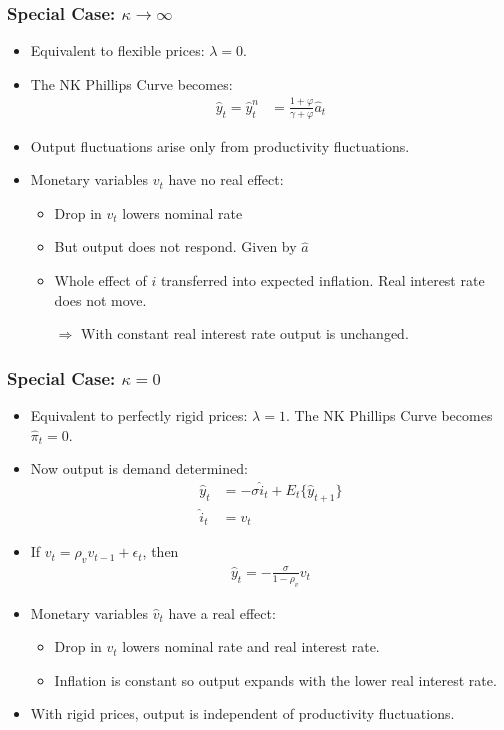 \documentclass[11pt,aspectratio=169,xcolor={dvipsnames},hyperref={pdftex,pdfpagemode=UseNone,hidelinks,pdfdisplaydoctitle=true},usepdftitle=false]{beamer}
\begin{document}
\begin{frame}
\frametitle{Special Case: $\kappa\rightarrow\infty$}
\begin{itemize}
	\item Equivalent to flexible prices: $\lambda=0$.
	\item The NK Phillips Curve becomes:
	\begin{align*}
		\hat{y}_t = \hat{y}_t^{n}&=\frac{1+\varphi}{\gamma+\varphi}\hat{a}_t 
	\end{align*}
	\item Output fluctuations arise only from productivity fluctuations.
	\item Monetary variables $v_t$ have no real effect:
	\begin{itemize}
		\item Drop in $v_t$ lowers nominal rate
		\item But output does not respond. Given by $\hat{a}$
		\item Whole effect of $i$ transferred into expected inflation. Real interest rate does not move.
		\item[$\Rightarrow$] With constant real interest rate output is unchanged.
	\end{itemize}
\end{itemize}
\end{frame}

\begin{frame}
\frametitle{Special Case: $\kappa=0$}
\begin{itemize}
	\item Equivalent to perfectly rigid prices: $\lambda=1$.  The NK Phillips Curve becomes $\hat{\pi}_t=0$.
	\item Now output is demand determined:
	\begin{align*}
		\hat{y}_t &=-\sigma\hat{i}_t +E_t\{\hat{y}_{t+1}\} \\
		\hat{i}_t&=v_t 
	\end{align*}
	\item If $v_t = \rho_v v_{t-1}+\epsilon_t$, then
	\begin{align*}
		\hat{y}_t = -\frac{\sigma}{1-\rho_v}v_t
	\end{align*}
	\item Monetary variables $\hat{v}_t$ have a real effect:
	\begin{itemize}
		\item Drop in $v_t$ lowers nominal rate and real interest rate.
		\item Inflation is constant so output expands with the lower real interest rate.
	\end{itemize}
	\item With rigid prices, output is independent of productivity fluctuations.
\end{itemize}
\end{frame}
\end{document}
